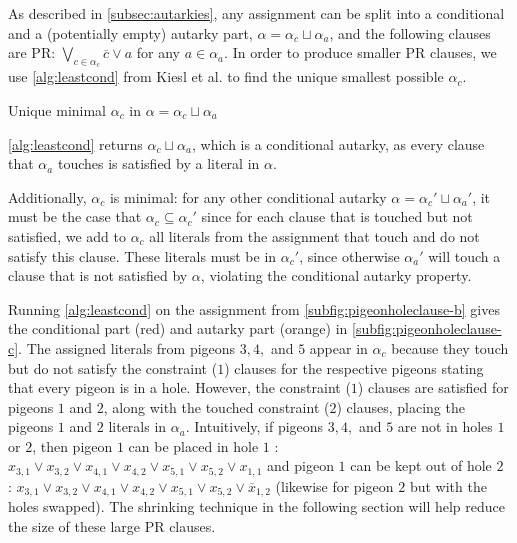 As described in \autoref{subsec:autarkies}, any assignment can be split into a
conditional and a (potentially empty) autarky part, $\alpha = \alpha_c \sqcup \alpha_a$, and the
following clauses are PR: $\bigvee_{c \in \alpha_c} \overline{c} \lor a$ for
any $a \in \alpha_a$. In order to produce smaller PR clauses, we use
\autoref{alg:leastcond} from Kiesl et al. \cite{conditionalautarkies} to find
the unique smallest possible $\alpha_c$.


\begin{algorithm}
    \caption{Unique minimal $\alpha_c$ in $\alpha = \alpha_c \sqcup
    \alpha_a$}\label{alg:leastcond} \SetAlgoNoLine
     
      

\end{algorithm}

\autoref{alg:leastcond} returns $\alpha_c \sqcup \alpha_a$, which is a
conditional autarky, as every clause that $\alpha_a$ touches is satisfied by a
literal in $\alpha$.

Additionally, $\alpha_c$ is minimal: for any other conditional autarky $\alpha =
\alpha_c' \sqcup \alpha_a'$, it must be the case that $\alpha_c \subseteq
\alpha_c'$ since for each clause that is touched but not satisfied, we add to
$\alpha_c$ all literals from the assignment that touch and do not satisfy this
clause. These literals must be in $\alpha_c'$, since otherwise $\alpha_a'$ will touch a
clause that is not satisfied by $\alpha$, violating the conditional autarky
property.

Running \autoref{alg:leastcond} on the assignment from
\autoref{subfig:pigeonholeclause-b}  
gives the conditional part (red) and autarky part (orange) in
\autoref{subfig:pigeonholeclause-c}. The assigned literals from pigeons $3,4,$
and $5$ appear in $\alpha_c$ because they touch but do not satisfy the
constraint ($1$) clauses for the respective pigeons stating that every pigeon is
in a hole. However, the constraint ($1$) clauses are satisfied for pigeons $1$
and $2$, along with the touched constraint ($2$) clauses, placing the pigeons
$1$ and $2$ literals in $\alpha_a$. Intuitively, if pigeons $3,4,$ and $5$ are
not in holes $1$ or $2$, then pigeon $1$ can be placed in hole $1$ : $x_{3,1}
\lor x_{3,2} \lor x_{4,1} \lor x_{4,2} \lor x_{5,1} \lor x_{5,2} \lor x_{1,1} $
and pigeon $1$ can be kept out of hole $2$ : $x_{3,1} \lor x_{3,2} \lor x_{4,1}
\lor x_{4,2} \lor x_{5,1} \lor x_{5,2} \lor \overline{x}_{1,2} $ (likewise for
pigeon $2$ but with the holes swapped). 
The shrinking technique in the following section will help reduce the size of
these large PR clauses. 



